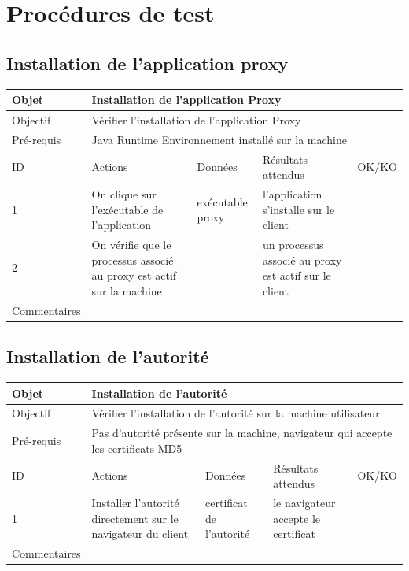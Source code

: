 \documentclass[a4paper,11pt,french]{article}
\begin{document}
\section{Procédures de test}
\subsection{Installation de l'application proxy}

\begin{tabular}{|m{2.5cm}|m{4cm}|m{3cm}|m{3.5cm}|m{2cm}|}
\hline 
\rowcolor{Blue} Objet & \multicolumn{4}{|l|}{Installation de l'application Proxy} \\ 
\hline 
\rowcolor{Blue} Objectif & \multicolumn{4}{|l|}{Vérifier l'installation de l'application Proxy} \\ 
\hline 
\rowcolor{Blue} Pré-requis & \multicolumn{4}{|l|}{Java Runtime Environnement installé sur la machine} \\ 
\hline 
\rowcolor{Orange} ID & Actions & Données & Résultats attendus & OK/KO \\ 
\hline 
1 & On clique sur l'exécutable de l'application & exécutable proxy & l'application s'installe sur le client &  \\ 
\hline
2 & On vérifie que le processus associé au proxy est actif sur la machine & & un processus associé au proxy est actif sur le client & \\
\hline
Commentaires & \multicolumn{4}{|l|}{} \\ 
\hline
\end{tabular}

\newpage

\subsection{Installation de l'autorité}

\begin{tabular}{|m{2.5cm}|m{4cm}|m{3cm}|m{3.5cm}|m{2cm}|}
\hline 
\rowcolor{Blue} Objet & \multicolumn{4}{|l|}{Installation de l'autorité} \\ 
\hline 
\rowcolor{Blue} Objectif & \multicolumn{4}{|l|}{Vérifier l'installation de l'autorité sur la machine utilisateur} \\ 
\hline 
\rowcolor{Blue} Pré-requis & \multicolumn{4}{|l|}{Pas d'autorité présente sur la machine, navigateur qui accepte les certificats MD5} \\ 
\hline 
\rowcolor{Orange} ID & Actions & Données & Résultats attendus & OK/KO \\ 
\hline 
1 & Installer l'autorité directement sur le navigateur du client & certificat de l'autorité & le navigateur accepte le certificat &  \\ 
\hline 
Commentaires & \multicolumn{4}{|l|}{} \\ 
\hline
\end{tabular}
\end{document}
